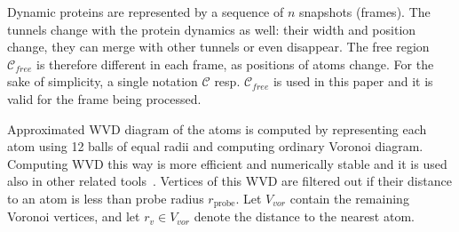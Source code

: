 \documentclass{llncs}
\def\C{\mathcal{C}}
\def\CF{\mathcal{C}_{free}}
\def\VV{V_{vor}}
\def\probe{r_{\mathrm{probe}}}
\def\Sprobe{S_{\mathrm{probe}}}
\begin{document}
Dynamic proteins are represented by a sequence of $n$ snapshots (frames).
The tunnels change with the protein dynamics as well: their width and position change, they can merge with other tunnels
or even disappear.
The free region $\CF$ is therefore different in each frame, as positions of atoms change.
For the sake of simplicity, a single notation $\C$ resp. $\CF$ is used in this paper and it is valid for the frame being processed.

Approximated WVD diagram of the atoms is computed by representing each atom using 12 balls of equal radii and computing ordinary Voronoi diagram.
Computing WVD this way is more efficient and numerically stable and it is used also in other related tools~\cite{caver3,yaffe2008}.
Vertices of this WVD are filtered out if their distance to an atom is less than probe radius $\probe$.
Let $\VV$ contain the remaining Voronoi vertices, and let $r_v \in \VV$ denote the distance to the nearest atom.




\end{document}
